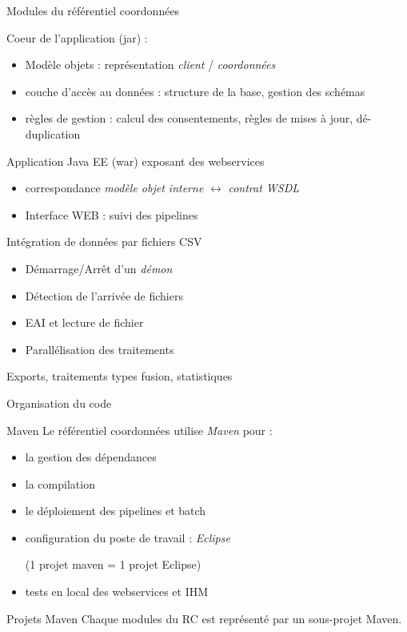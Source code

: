 \documentclass[compact]{beamer}%
\begin{document}
\begin{frame}{Modules du référentiel coordonnées}
	\begin{description}[<+->]
	\item[Core] Coeur de l'application (jar) :
		\begin{itemize}
		\item Modèle objets : représentation \emph{client} / \emph{coordonnées}
		\item couche d'accès au données : structure de la base, gestion des schémas
		\item règles de gestion : calcul des consentements, règles de mises à jour, dé-duplication
		\end{itemize}
	\item[Webservices] Application Java EE (war) exposant des webservices
		\begin{itemize}
		\item correspondance \emph{modèle objet interne} $\leftrightarrow$ \emph{contrat WSDL}
		\item Interface WEB : suivi des pipelines
		\end{itemize}
	\item[Pipelines] Intégration de données par fichiers CSV
		\begin{itemize}
		\item Démarrage/Arrêt d'un \emph{démon}
		\item Détection de l'arrivée de fichiers
		\item EAI et lecture de fichier
		\item Parallélisation des traitements
		\end{itemize}
	\item[Batch] Exports, traitements types fusion, statistiques
	\end{description}
\end{frame}


\begin{frame}{Organisation du code}
	
	\begin{block}{Maven}
	Le référentiel coordonnées utilise \emph{Maven} pour : 
	\begin{itemize}
	\item la gestion des dépendances
	\item la compilation 
	\item le déploiement des pipelines et batch
	\item configuration du poste de travail : \emph{Eclipse}\par
	(1 projet maven = 1 projet Eclipse)
	\item tests en local des webservices et IHM
	\end{itemize}
	\end{block}
	
	\pause
	\begin{block}{Projets Maven}
	Chaque modules du RC est représenté par un sous-projet Maven.
	\end{block}

\end{frame}
\end{document}
